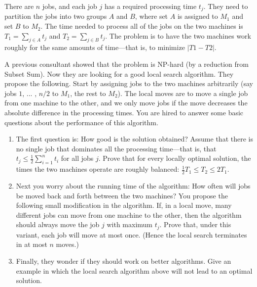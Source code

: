 \documentclass{article}
\begin{document}
\begin{enumerate}
There are $n$ jobs, and each job $j$ has a required processing time $t_j$. They need to partition the jobs into two groups $A$ and $B$, where set $A$ is assigned to $M_1$ and set $B$ to $M_2$. The time needed to process all of the jobs on the two machines is $T_1 = \sum_{j \in A} t_j$ and $T_2 = \sum_{j \in B} t_j$. The problem is to have the two machines work roughly for the same amounts of time—that is, to minimize $\left | T1 - T2 \right |$.

A previous consultant showed that the problem is NP-hard (by a reduction from Subset Sum). Now they are looking for a good local search algorithm. They propose the following. Start by assigning jobs to the two machines arbitrarily (say jobs $1$, ... , $n/2$ to $M_1$, the rest to $M_2$). The local moves are to move a single job from one machine to the other, and we only move jobs if the move decreases the absolute difference in the processing times. You are hired to answer some basic questions about the performance of this algorithm.

\begin{enumerate}
    \item The first question is: How good is the solution obtained? Assume that there is no single job that dominates all the processing time—that is, that $t_j \leqslant  \frac{1}{2} \sum_{i=1}^n t_i$ for all jobs $j$. Prove that for every locally  optimal solution, the times the two machines operate are roughly balanced: $\frac{1}{2}T_1 \leqslant T_2 \leqslant 2T_1$.
    \item Next you worry about the running time of the algorithm: How often will jobs be moved back and forth between the two machines? You propose the following small modification in the algorithm. If, in a local move, many different jobs can move from one machine to the other, then the algorithm should always move the job $j$ with maximum $t_j$. Prove that, under this variant, each job will move at most once. (Hence the local search terminates in at most $n$ moves.)
    \item Finally, they wonder if they should work on better algorithms. Give an example in which the local search algorithm above will not lead to an optimal solution.
\end{enumerate}


\end{enumerate}
\end{document}
